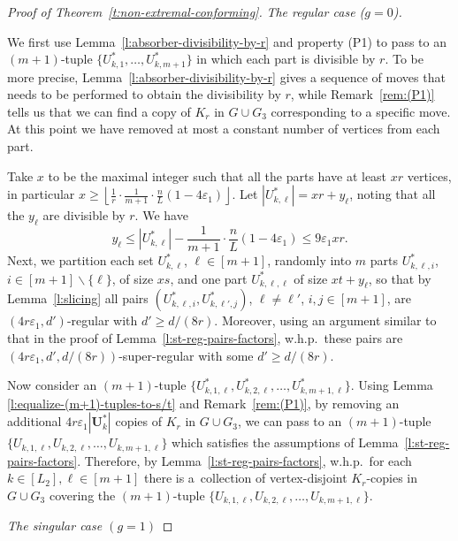 \documentclass[reqno, 12pt]{amsart}
\numberwithin{equation}{section}
\numberwithin{figure}{section}
\theoremstyle{plain}
\theoremstyle{definition}
\let\eps=\varepsilon
\def\Ub{\mathbf{U}}
\let\setminus=\smallsetminus
\begin{document}
\begin{proof}[Proof of Theorem~\ref{t:non-extremal-conforming}]
    \smallskip

    \textit{The regular case ($g=0$).}

    \smallskip
       
    We first use Lemma~\ref{l:absorber-divisibility-by-r} and property (P1) to pass to an $(m+1)$-tuple $\{U_{k,1}^*, \ldots, U_{k,m+1}^*\}$ in which each part is divisible by $r$. To be more precise, Lemma~\ref{l:absorber-divisibility-by-r} gives a sequence of moves that needs to be performed to obtain the divisibility by $r$, while Remark~\ref{rem:(P1)} tells us that we can find a copy of $K_r$ in $G\cup G_3$ corresponding to a specific move. At this point we have removed at most a constant number of vertices from each part.
    
    Take $x$ to be the maximal integer such that all the parts have at least $xr$ vertices, in particular $x\geq \left\lfloor\frac1r\cdot\frac{1}{m+1}\cdot\frac{n}{L}(1-4\eps_1)\right\rfloor$. Let $|U_{k,\ell}^*| = xr+y_\ell$, noting that all the $y_\ell$ are divisible by $r$. We have 
    \[y_\ell\leq |U_{k,\ell}^*|-\frac{1}{m+1}\cdot\frac{n}{L}(1-4\eps_1)\leq 9\eps_1 xr.\] 
    Next, we partition each set $U_{k,\ell}^*$, $\ell\in[m+1]$, randomly into $m$ parts $U_{k,\ell,i}^*$, $i\in[m+1]\setminus\{\ell\}$, of size $xs$, and one part $U_{k,\ell,\ell}^*$ of size $xt+y_\ell$, so that by Lemma~\ref{l:slicing} all pairs $(U_{k,\ell,i}^*,U_{k,\ell',j}^*)$, $\ell\neq\ell'$, $i,j\in[m+1]$, are $(4r\eps_1, d')$-regular with $d' \geq d/(8r)$. Moreover, using an argument similar to that in the proof of Lemma~\ref{l:st-reg-pairs-factors}, w.h.p.~these pairs are $(4r\eps_1, d', d/(8r))$-super-regular with some $d' \geq d/(8r)$.
    
    Now consider an $(m+1)$-tuple $\{U^*_{k,1,\ell},U^*_{k,2,\ell},\ldots,U^*_{k,m+1,\ell}\}$. Using Lemma \ref{l:equalize-(m+1)-tuples-to-s/t} and Remark~\ref{rem:(P1)}, by removing an additional $4r\eps_1|\Ub_k^*|$ copies of $K_r$ in $G \cup G_3$, we can pass to an $(m+1)$-tuple $\{U_{k,1,\ell},U_{k,2,\ell},\ldots,U_{k,m+1,\ell}\}$ which satisfies the assumptions of Lemma~\ref{l:st-reg-pairs-factors}. Therefore, by Lemma~\ref{l:st-reg-pairs-factors}, w.h.p.~for each $k\in[L_2], \ell\in[m+1]$ there is a~collection of vertex-disjoint $K_r$-copies in $G \cup G_3$ covering the $(m+1)$-tuple $\{U_{k,1,\ell},U_{k,2,\ell},\ldots,U_{k,m+1,\ell}\}$.

    \smallskip

    \textit{The singular case $(g=1)$}

    \smallskip


\end{proof}
\end{document}
